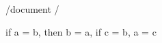 /document
/\begin{theorem}
  if a = b, then b = a,
    if c = b, a = c
  \begin{displaymath}
    
  \end{displaymath}
  
\end{theorem}

